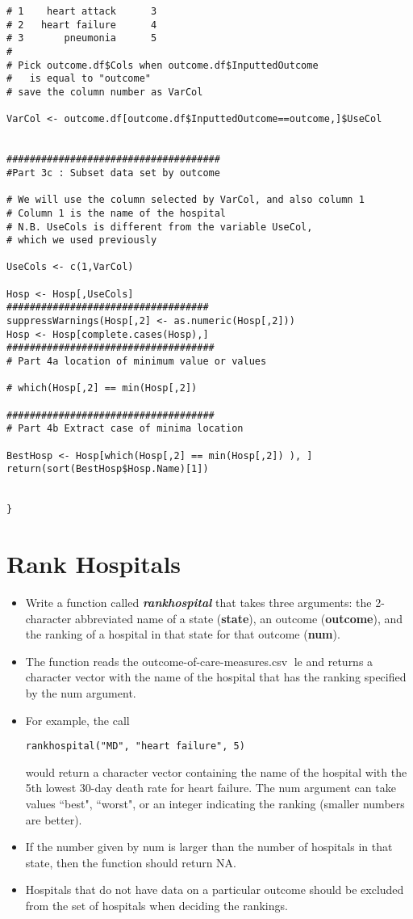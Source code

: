 \documentclass[]{article}
\begin{document}
\begin{framed}
\begin{verbatim}
# 1    heart attack      3
# 2   heart failure      4
# 3       pneumonia      5
#
# Pick outcome.df$Cols when outcome.df$InputtedOutcome 
#   is equal to "outcome"
# save the column number as VarCol

VarCol <- outcome.df[outcome.df$InputtedOutcome==outcome,]$UseCol


#####################################
#Part 3c : Subset data set by outcome

# We will use the column selected by VarCol, and also column 1
# Column 1 is the name of the hospital
# N.B. UseCols is different from the variable UseCol, 
# which we used previously

UseCols <- c(1,VarCol)

Hosp <- Hosp[,UseCols]
###################################
suppressWarnings(Hosp[,2] <- as.numeric(Hosp[,2]))
Hosp <- Hosp[complete.cases(Hosp),]
####################################
# Part 4a location of minimum value or values

# which(Hosp[,2] == min(Hosp[,2])

####################################
# Part 4b Extract case of minima location 

BestHosp <- Hosp[which(Hosp[,2] == min(Hosp[,2]) ), ]
return(sort(BestHosp$Hosp.Name)[1])


}
\end{verbatim}
\end{framed}

\newpage
\section{Rank Hospitals}

\begin{itemize}
\item Write a function called \textit{\textbf{rankhospital}} that takes three arguments: the 2-character abbreviated name of a
state (\textbf{state}), an outcome (\textbf{outcome}), and the ranking of a hospital in that state for that outcome (\textbf{num}).
\item The function reads the outcome-of-care-measures.csv le and returns a character vector with the name
of the hospital that has the ranking specified by the num argument. 
\item For example, the call
\begin{verbatim}
rankhospital("MD", "heart failure", 5)
\end{verbatim}
would return a character vector containing the name of the hospital with the 5th lowest 30-day death rate
for heart failure. The num argument can take values ``best", ``worst", or an integer indicating the ranking
(smaller numbers are better). \item If the number given by num is larger than the number of hospitals in that
state, then the function should return NA. \item Hospitals that do not have data on a particular outcome should
be excluded from the set of hospitals when deciding the rankings.
\end{itemize}
\newpage
\end{document}
